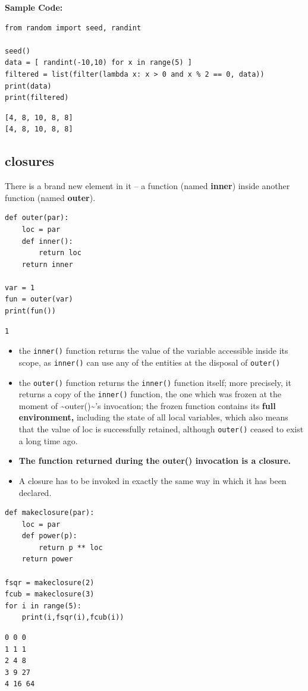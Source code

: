 \documentclass[11pt]{article}
\begin{document}
\textbf{Sample Code:}

\begin{verbatim}
from random import seed, randint

seed()
data = [ randint(-10,10) for x in range(5) ]
filtered = list(filter(lambda x: x > 0 and x % 2 == 0, data))
print(data)
print(filtered)
\end{verbatim}

\begin{verbatim}
[4, 8, 10, 8, 8]
[4, 8, 10, 8, 8]
\end{verbatim}
\vspace{10 mm}

\subsection{closures}
\label{sec:orgff51a59}
There is a brand new element in it – a function (named \textbf{inner}) inside
another function (named \textbf{outer}).

\begin{verbatim}
def outer(par):
	loc = par
	def inner():
		return loc
	return inner

var = 1
fun = outer(var)
print(fun())
\end{verbatim}

\begin{verbatim}
1
\end{verbatim}

\vspace{10 mm}

\begin{itemize}
\item the \texttt{inner()} function returns the value of the variable accessible
inside its scope, as \texttt{inner()} can use any of the entities at the
disposal of \texttt{outer()}
\item the \texttt{outer()} function returns the \texttt{inner()} function itself; more
precisely, it returns a copy of the \texttt{inner()} function, the one
which was frozen at the moment of \textasciitilde{}outer()\textasciitilde{}’s invocation; the frozen
function contains its \textbf{full environment,} including the state of all
local variables, which also means that the value of loc is
successfully retained, although \texttt{outer()} ceased to exist a long time
ago.

\item \textbf{The function returned during the outer() invocation is a closure.}

\item A closure has to be invoked in exactly the same way in which it has been declared.
\end{itemize}

\begin{verbatim}
def makeclosure(par):
	loc = par
	def power(p):
		return p ** loc
	return power

fsqr = makeclosure(2)
fcub = makeclosure(3)
for i in range(5):
	print(i,fsqr(i),fcub(i))
\end{verbatim}

\begin{verbatim}
0 0 0
1 1 1
2 4 8
3 9 27
4 16 64
\end{verbatim}
\end{document}
